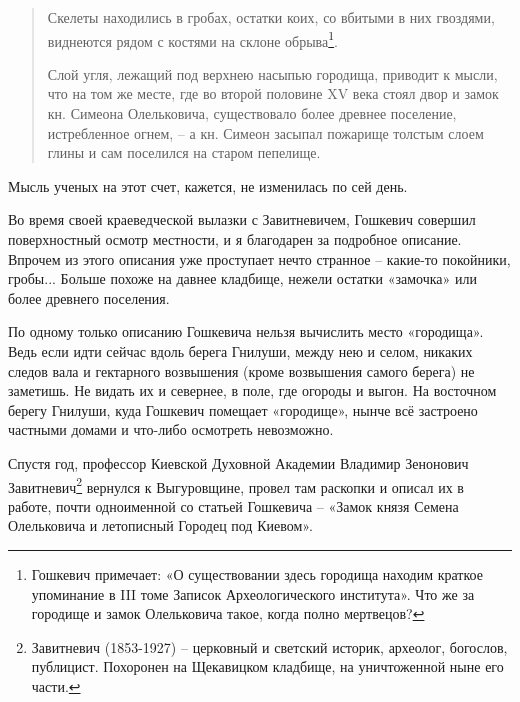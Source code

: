 \begin{quotation}
Скелеты находились в гробах, остатки коих, со вбитыми в них гвоздями, виднеются рядом с костями на склоне обрыва\footnote{Гошкевич примечает: «О существовании здесь городища находим краткое упоминание в III томе Записок Археологического института». Что же за городище и замок Олельковича такое, когда полно мертвецов?}.

Слой угля, лежащий под верхнею насыпью городища, приводит к мысли, что на том же месте, где во второй половине XV века стоял двор и замок кн. Симеона Олельковича, существовало более древнее поселение, истребленное огнем, – а кн. Симеон засыпал пожарище толстым слоем глины и сам поселился на старом пепелище.
\end{quotation}

Мысль ученых на этот счет, кажется, не изменилась по сей день.

Во время своей краеведческой вылазки с Завитневичем, Гошкевич совершил поверхностный осмотр местности, и я благодарен за подробное описание. Впрочем из этого описания уже проступает нечто странное – какие-то покойники, гробы... Больше похоже на давнее кладбище, нежели остатки «замочка» или более древнего поселения.

По одному только описанию Гошкевича нельзя вычислить место «городища». Ведь если идти сейчас вдоль берега Гнилуши, между нею и селом, никаких следов вала и гектарного возвышения (кроме возвышения самого берега) не заметишь. Не видать их и севернее, в поле, где огороды и выгон. На восточном берегу Гнилуши, куда Гошкевич помещает «городище», нынче всё застроено частными домами и что-либо осмотреть невозможно.

Спустя год, профессор Киевской Духовной Академии Владимир Зенонович Завитневич\footnote{Завитневич (1853-1927) – церковный и светский историк, археолог, богослов, публицист. Похоронен на Щекавицком кладбище, на уничтоженной ныне его части.} вернулся к Выгуровщине, провел там раскопки и описал их в работе, почти одноименной со статьей Гошкевича – «Замок князя Семена Олельковича и летописный Городец под Киевом»\cite{zavit01}.


